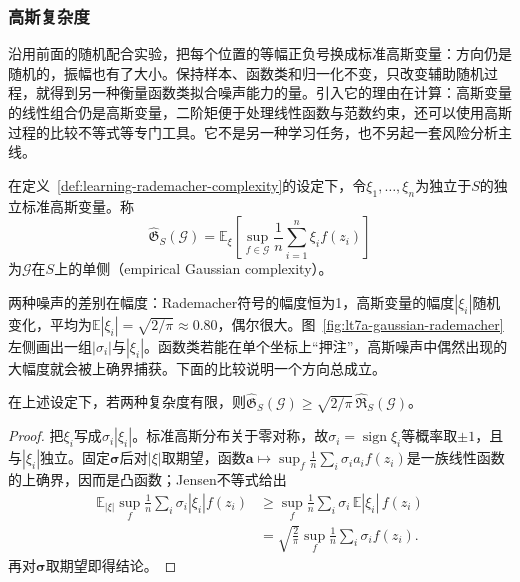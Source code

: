 \subsubsection{高斯复杂度}

沿用前面的随机配合实验，把每个位置的等幅正负号换成标准高斯变量：方向仍是随机的，振幅也有了大小。保持样本、函数类和归一化不变，只改变辅助随机过程，就得到另一种衡量函数类拟合噪声能力的量。引入它的理由在计算：高斯变量的线性组合仍是高斯变量，二阶矩便于处理线性函数与范数约束，还可以使用高斯过程的比较不等式等专门工具。它不是另一种学习任务，也不另起一套风险分析主线。

\begin{definition}[高斯复杂度]
\label{def:learning-gaussian-complexity}
在定义~\ref{def:learning-rademacher-complexity}的设定下，令$\xi_1,\ldots,\xi_n$为独立于$S$的独立标准高斯变量。称
\[
 \widehat{\mathfrak G}_S(\mathcal G)
 =\mathbb E_\xi\left[\sup_{f\in\mathcal G}\frac1n\sum_{i=1}^n \xi_i f(z_i)\right]
\]
为$\mathcal G$在$S$上的单侧（empirical Gaussian complexity）。
\end{definition}

两种噪声的差别在幅度：Rademacher符号的幅度恒为1，高斯变量的幅度$|\xi_i|$随机变化，平均为$\mathbb E|\xi_i|=\sqrt{2/\pi}\approx0.80$，偶尔很大。图~\ref{fig:lt7a-gaussian-rademacher}左侧画出一组$|\sigma_i|$与$|\xi_i|$。函数类若能在单个坐标上“押注”，高斯噪声中偶然出现的大幅度就会被上确界捕获。下面的比较说明一个方向总成立。

\begin{lemma}[高斯复杂度控制Rademacher复杂度]
\label{lem:gaussian-rademacher-comparison}
在上述设定下，若两种复杂度有限，则$\widehat{\mathfrak G}_S(\mathcal G)\geq\sqrt{2/\pi}\,\widehat{\mathfrak R}_S(\mathcal G)$。
\end{lemma}
\begin{proof}
把$\xi_i$写成$\sigma_i|\xi_i|$。标准高斯分布关于零对称，故$\sigma_i=\operatorname{sign}\xi_i$等概率取$\pm1$，且与$|\xi_i|$独立。固定$\bm\sigma$后对$|\xi|$取期望，函数$\bm a\mapsto\sup_f\frac1n\sum_i\sigma_ia_if(z_i)$是一族线性函数的上确界，因而是凸函数；Jensen不等式给出
\[
\begin{aligned}
 \mathbb E_{|\xi|}\sup_f\frac1n\sum_i\sigma_i|\xi_i|f(z_i)
 &\geq\sup_f\frac1n\sum_i\sigma_i\,\mathbb E|\xi_i|\,f(z_i)\\
 &=\sqrt{\frac2\pi}\sup_f\frac1n\sum_i\sigma_if(z_i).
\end{aligned}
\]
再对$\bm\sigma$取期望即得结论。
\end{proof}

